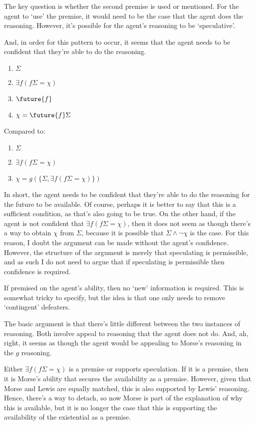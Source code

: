 \documentclass[10pt]{article}
\begin{document}
The key question is whether the second premise is used or mentioned.
For the agent to `use' the premise, it would need to be the case that the agent does the reasoning.
However, it's possible for the agent's reasoning to be `speculative'.

And, in order for this pattern to occur, it seems that the agent needs to be confident that they're able to do the reasoning.

\begin{enumerate}
\item \(\Sigma\)
\item \(\exists f(f\Sigma = \chi)\)
\item \(\future{f}\)
\item \(\chi = \future{f}\Sigma\)
\end{enumerate}

Compared to:

\begin{enumerate}
\item \(\Sigma\)
\item \(\exists f(f\Sigma = \chi)\)
\item \(\chi = g(\{\Sigma, \exists f(f\Sigma = \chi)\})\)
\end{enumerate}

In short, the agent needs to be confident that they're able to do the reasoning for the future to be available.
Of course, perhaps it is better to say that this is a sufficient condition, as that's also going to be true.
On the other hand, if the agent is not confident that \(\exists f(f\Sigma = \chi)\), then it does not seem as though there's a way to obtain \(\chi\) from \(\Sigma\), because it is possible that \(\Sigma \land \lnot\chi\) is the case.
For this reason, I doubt the argument can be made without the agent's confidence.
However, the structure of the argument is merely that speculating is permissible, and as such I do not need to argue that if speculating is permissible then confidence is required.

If premised on the agent's ability, then no `new' information is required.
This is somewhat tricky to specify, but the idea is that one only needs to remove `contingent' defeaters.

The basic argument is that there's little different between the two instances of reasoning.
Both involve appeal to reasoning that the agent does not do.
And, ah, right, it seems as though the agent would be appealing to Morse's reasoning in the \(g\) reasoning.

Either \(\exists f(f\Sigma = \chi)\) is a premise or supports speculation.
If it is a premise, then it is Morse's ability that secures the availability as a premise.
However, given that Morse and Lewis are equally matched, this is also supported by Lewis' reasoning.
Hence, there's a way to detach, so now Morse is part of the explanation of why this is available, but it is no longer the case that this is supporting the availability of the existential as a premise.
\end{document}
